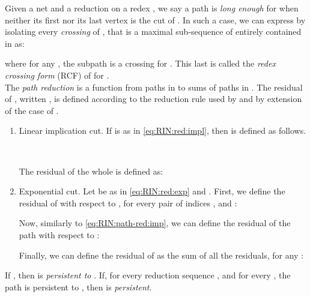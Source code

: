 \begin{definition}
\label{def:RIN:path-red}
Given a net  and a reduction  on a redex ,
we say a path  is \textit{long enough} for  when neither its 
first nor its last vertex is the cut of .
In such a case, we can express  by isolating every \textit{crossing} of 
, that is a maximal sub-sequence of  entirely contained in  as:

where for any , the subpath  is a crossing for .
This last is called the \textit{redex crossing form} (RCF) of  for .
\\
The \textit{path reduction} is a function from paths in  to sums 
of paths in .
The residual of , written , is defined according to the 
reduction rule used by  and by extension of the case of .
\begin{enumerate}
\item \label{def:RIN:path-red:imp}
  Linear implication cut.
  If  is as in \autoref{eq:RIN:red:impl},
  then  is defined as follows.\\
  \begin{minipage}{0.45\textwidth}
    
  \end{minipage}
  \begin{minipage}{0.45\textwidth}
    
  \end{minipage}\\\vspace{\lineskip}

  The residual of the whole  is defined as:
  
\item \label{def:RIN:path-red:exp}
  Exponential cut.
  Let  be as in \autoref{eq:RIN:red:exp} and .
  First, we define the residual of  with respect to ,
  for every pair of indices , and :
  
  Now, similarly to \autoref{eq:RIN:path-red:imp}, we can define the residual 
  of the path  with respect to :
  
  Finally, we can define the residual of  as the sum of all the residuals, 
  for any :
  
\end{enumerate}
If , then  is \textit{persistent to }.
If, for every reduction sequence , and for 
every , the path  is persistent to , then  
is \textit{persistent}.
\end{definition}

